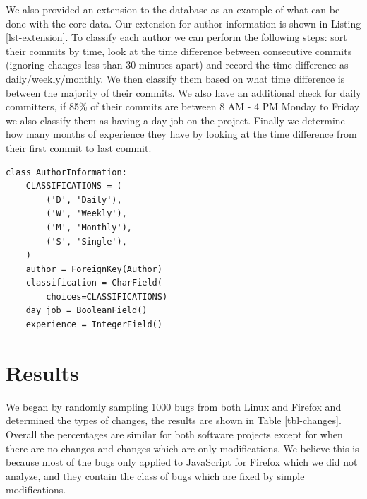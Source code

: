 \documentclass[preprint, 11pt]{sigplanconf}
\begin{document}
We also provided an extension to the database as an example of what
can be done with the core data. Our extension for author information
is shown in Listing \ref{lst-extension}. To classify each author we
can perform the following steps: sort their commits by time, look at
the time difference between consecutive commits (ignoring changes less
than 30 minutes apart) and record the time difference as
daily/weekly/monthly. We then classify them based on what time
difference is between the majority of their commits. We also have an
additional check for daily committers, if 85\% of their commits are
between 8 AM - 4 PM Monday to Friday we also classify them as having a
day job on the project. Finally we determine how many months of
experience they have by looking at the time difference from their
first commit to last commit.

\begin{lstlisting}[caption=Extension to database schema,label=lst-extension,frame=single]
class AuthorInformation:
    CLASSIFICATIONS = (
        ('D', 'Daily'),
        ('W', 'Weekly'),
        ('M', 'Monthly'),
        ('S', 'Single'),
    )
    author = ForeignKey(Author)
    classification = CharField(
        choices=CLASSIFICATIONS)
    day_job = BooleanField()
    experience = IntegerField()    
\end{lstlisting}

\section{Results}
\label{sec-results}

We began by randomly sampling 1000 bugs from both Linux and Firefox
and determined the types of changes, the results are shown in Table
\ref{tbl-changes}. Overall the percentages are similar for both
software projects except for when there are no changes and changes
which are only modifications. We believe this is because most of the
bugs only applied to JavaScript for Firefox which we did not analyze,
and they contain the class of bugs which are fixed by simple
modifications.
\end{document}
